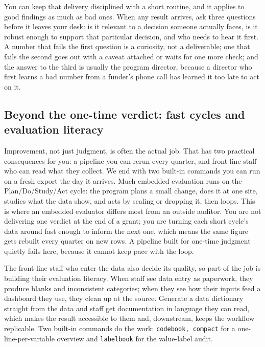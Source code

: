 \documentclass[
    a4paper,
    fontsize=10pt,
    twoside=true,
    numbers=noenddot,
]{kaobook}
\begin{document}
You can keep that delivery disciplined with a short routine, and it applies to good findings as much as bad ones. When any result arrives, ask three questions before it leaves your desk: is it relevant to a decision someone actually faces, is it robust enough to support that particular decision, and who needs to hear it first. A number that fails the first question is a curiosity, not a deliverable; one that fails the second goes out with a caveat attached or waits for one more check; and the answer to the third is usually the program director, because a director who first learns a bad number from a funder's phone call has learned it too late to act on it.

\subsection{Beyond the one-time verdict: fast cycles and evaluation literacy}\label{sec:ch01-beyond-verdict}
Improvement, not just judgment, is often the actual job. That has two practical consequences for you: a pipeline you can rerun every quarter, and front-line staff who can read what they collect. We end with two built-in commands you can run on a fresh export the day it arrives. Much embedded evaluation runs on the Plan\slash Do\slash Study\slash Act cycle: the program plans a small change, does it at one site, studies what the data show, and acts by scaling or dropping it, then loops. This is where an embedded evaluator differs most from an outside auditor. You are not delivering one verdict at the end of a grant; you are turning each short cycle's data around fast enough to inform the next one, which means the same figure gets rebuilt every quarter on new rows. A pipeline built for one-time judgment quietly fails here, because it cannot keep pace with the loop.

The front-line staff who enter the data also decide its quality, so part of the job is building their evaluation literacy. When staff see data entry as paperwork, they produce blanks and inconsistent categories; when they see how their inputs feed a dashboard they use, they clean up at the source. Generate a data dictionary straight from the data and staff get documentation in language they can read, which makes the result accessible to them and, downstream, keeps the workflow replicable. Two built-in commands do the work: \texttt{codebook, compact} for a one-line-per-variable overview and \texttt{labelbook} for the value-label audit.
\end{document}
